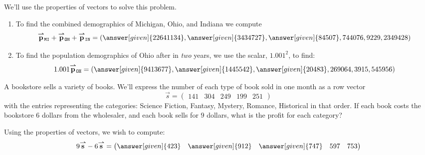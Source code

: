 \documentclass{ximera}
\begin{document}
\begin{example}
\begin{explanation}
  We'll use the properties of vectors to solve this problem.
  \begin{enumerate}
  \item To find the combined demographics of Michigan, Ohio, and
    Indiana we compute
    \[
    \vec{p}_{\texttt{MI}} + \vec{p}_{\texttt{OH}} + \vec{p}_{\texttt{IN}} = \left(\answer[given]{22641134},\answer[given]{3434727},\answer[given]{84507},744076,9229,2349428\right)
    \]
  \item To find the population demographics of Ohio after in
    \textit{two} years, we use the scalar, $1.001^2$, to find:
    \[
      1.001 \vec{p}_{\texttt{OH}}
      =\left(\answer[given]{9413677},\answer[given]{1445542},\answer[given]{20483},269064,3915,545956
      \right)
    \]
  \end{enumerate}
\end{explanation}
\end{example}



\begin{example}
  A bookstore sells a variety of books. We'll express the number of
  each type of book sold in one month as a row vector
  \[
  \vec{s} = \begin{pmatrix}141 & 304 & 249 & 199 & 251 \end{pmatrix}
  \]
  with the entries representing the categories: Science Fiction,
  Fantasy, Mystery, Romance, Historical in that order.  If each book
  costs the bookstore $6$ dollars from the wholesaler, and each book sells
  for $9$ dollars, what is the profit for each category?
  \begin{explanation}
    Using the properties of vectors, we wish to compute:
    \[
    9\vec{s}-6\vec{s} = \begin{pmatrix} \answer[given]{423} & \answer[given]{912} & \answer[given]{747} & 597 & 753 \end{pmatrix}
    \]
  \end{explanation}
\end{example}
\end{document}
